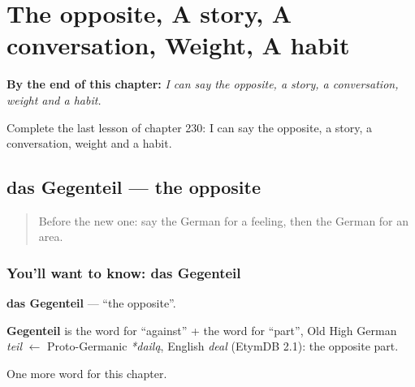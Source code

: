
\chapter{The opposite, A story, A conversation, Weight, A habit}
\label{ch:ge-the-opposite-a-story-a-conversation-weight-a-habit}

\begin{chapteropening}
\textbf{By the end of this chapter:} \emph{I can say the opposite, a story, a conversation, weight and a habit.}

Complete the last lesson of chapter 230: I can say the opposite, a story, a conversation, weight and a habit.
\end{chapteropening}

\section[das Gegenteil]{das Gegenteil — the opposite}

\label{lesson:GE-C230-gegenteil}



\begin{quote}
Before the new one: say the German for a feeling, then the German for an area.
\end{quote}

\subsection*{You'll want to know: das Gegenteil}
\textbf{das Gegenteil} — \textquotedblleft{}the opposite\textquotedblright{}.

\begin{cousinweb}
\textbf{Gegenteil} is the word for \textquotedblleft{}against\textquotedblright{} + the word for \textquotedblleft{}part\textquotedblright{}, Old High German \emph{teil} $\leftarrow$ Proto-Germanic \emph{*dailą}, English \emph{deal} (EtymDB 2.1): the opposite part.
\end{cousinweb}

\begin{grammarlens}[title={What you've built}]
One more word for this chapter.
\end{grammarlens}

